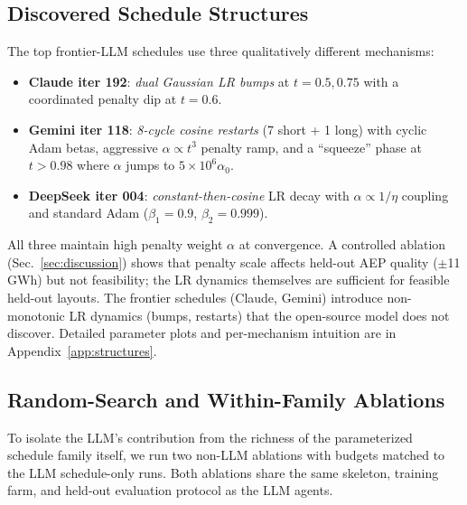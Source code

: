 \subsection{Discovered Schedule Structures}
\label{sec:structures}

The top frontier-LLM schedules use three qualitatively different
mechanisms:
\begin{itemize}[nosep]
\item \textbf{Claude iter 192}: \emph{dual Gaussian LR bumps} at
  $t=0.5, 0.75$ with a coordinated penalty dip at $t=0.6$.
\item \textbf{Gemini iter 118}: \emph{8-cycle cosine restarts}
  (7 short + 1 long) with cyclic Adam betas, aggressive $\alpha
  \propto t^3$ penalty ramp, and a ``squeeze'' phase at $t>0.98$
  where $\alpha$ jumps to $5\!\times\!10^6 \alpha_0$.
\item \textbf{DeepSeek iter 004}: \emph{constant-then-cosine}
  LR decay with $\alpha \propto 1/\eta$ coupling and standard
  Adam ($\beta_1\!=\!0.9$, $\beta_2\!=\!0.999$).
\end{itemize}
All three maintain high penalty weight $\alpha$ at convergence.
A controlled ablation (Sec.~\ref{sec:discussion}) shows that
penalty scale affects held-out AEP quality ($\pm$11\,GWh) but
not feasibility; the LR dynamics themselves are sufficient for
feasible held-out layouts.  The frontier schedules (Claude, Gemini)
introduce non-monotonic LR dynamics (bumps, restarts) that the
open-source model does not discover.
Detailed parameter plots and per-mechanism intuition are in
Appendix~\ref{app:structures}.

\subsection{Random-Search and Within-Family Ablations}
\label{sec:ablations}

To isolate the LLM's contribution from the richness of the
parameterized schedule family itself, we run two non-LLM ablations
with budgets matched to the LLM schedule-only runs. Both ablations
share the same skeleton, training farm, and held-out evaluation
protocol as the LLM agents.

